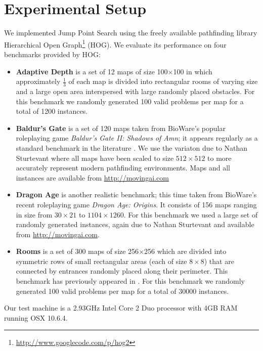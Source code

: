 \section{Experimental Setup}
\label{cha::jps::setup}
We implemented Jump Point Search using the freely available pathfinding library
Hierarchical Open Graph\footnote{\url{http://www.googlecode.com/p/hog2}} (HOG).
We evaluate its performance on four benchmarks provided by HOG:
\begin{itemize}

\item{\textbf{Adaptive Depth}
is a set of 12 maps of size 100$\times$100 in which approximately $\frac{1}{3}$
of each map is divided into rectangular rooms of varying size and a large
open area interspersed with large randomly placed obstacles.
For this benchmark we randomly generated 100 valid problems per map for a 
total of 1200 instances.
} 

\item{\textbf{Baldur's Gate} is a set of 120 maps taken from BioWare's popular
roleplaying game \emph{Baldur's Gate II: Shadows of Amn}; it 
appears regularly as a standard benchmark in the literature
\citep{bjornsson06,harabor10,pochter10}.
We use the variaton due to Nathan Sturtevant where all maps have been scaled to size
$512\times512$ to more accurately represent modern pathfinding environments.
Maps and all instances are available from \url{http://movingai.com}
}

\item{\textbf{Dragon Age} is another realistic benchmark; this time taken from
BioWare's recent roleplaying game \emph{Dragon Age: Origins}.
It consists of 156 maps ranging in size 
from $30\times21$ to $1104\times1260$.
For this benchmark we used a large set of randomly generated instances,
again due to Nathan Sturtevant and available from \url{http://movingai.com}.
}

\item{\textbf{Rooms} is a set of 300 maps of size
256$\times$256 which are divided into symmetric rows of small 
rectangular areas (each of size $8\times8$) that are connected by entrances
randomly placed along their perimeter. This benchmark has
previously appeared in \citep{pochter10}.
For this benchmark we randomly generated 100 valid problems per map for a 
total of 30000 instances.
}
\end{itemize}

Our test machine is a 2.93GHz Intel Core 2 Duo processor with 4GB RAM running OSX 
10.6.4.  
